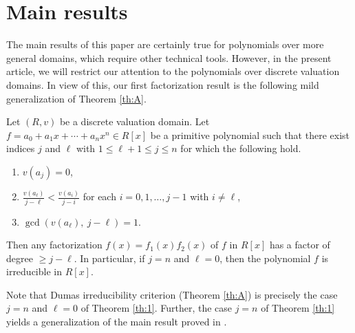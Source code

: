 \documentclass[12pt]{amsart}%
\begin{document}
\section{Main results}\label{sec:1}
The main results of this paper are certainly true for polynomials over more general domains, which  require other technical tools. However, in the present article, we will restrict our attention to the polynomials over discrete valuation domains.
In view of this, our first factorization result is the following mild generalization of Theorem \ref{th:A}.
\begin{theorem}\label{th:1}
Let $(R,v)$  be a discrete valuation domain. Let $f=a_0 + a_1x + \cdots + a_nx^n \in {R}[x]$ be a primitive polynomial such that there exist indices $j$ and $\ell$ with $1\leq \ell+1 \leq j\leq n$ for which the following hold.
\begin{enumerate}[label=$(\roman*)$]
\item $v(a_j)=0$,
\item $\frac{v(a_\ell)}{j-\ell}<\frac{v(a_i)}{j-i}$ for each $i=0,1,\ldots, j-1$ with $i\neq \ell$,
\item $\gcd(v(a_\ell),~j-\ell) = 1$.
\end{enumerate}
Then any factorization $f(x)=f_1(x)f_2(x)$ of $f$ in $R[x]$ has a factor of degree $\geq j-\ell$. In particular, if $j=n$ and $\ell=0$, then the polynomial $f$ is irreducible in $R[x]$.
\end{theorem}
Note that Dumas irreducibility criterion (Theorem \ref{th:A})  is precisely the case $j=n$ and $\ell=0$ of Theorem \ref{th:1}. Further, the case $j=n$ of Theorem \ref{th:1} yields a generalization of the main result proved in \cite{W}.
\end{document}
